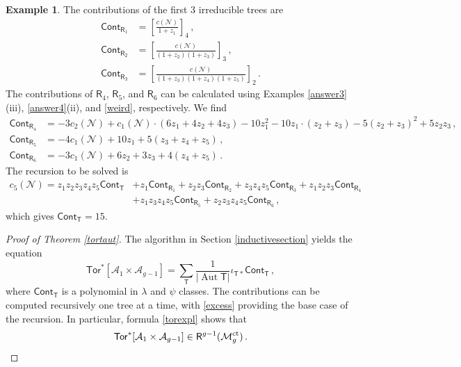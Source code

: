 \documentclass[11pt]{amsart}
\theoremstyle{definition}
\newtheorem{example}[thm]{Example}
\newcommand{\R}{\mathsf{R}}
\newcommand{\M}{\mathcal{M}}
\newcommand{\A}{\mathcal{A}}
\DeclareMathOperator{\ct}{ct}
\DeclareMathOperator{\Aut}{Aut}
\newcommand{\Tor}{\mathsf{Tor}}
\begin{document}
{\begin{example}
The contributions of the first $3$ irreducible trees are 
\begin{align*}\mathsf {Cont}_{\mathsf R_1}&=\left[\frac{c(\mathcal N)}{1+z_1}\right]_{4}\,,\\
\mathsf{Cont}_{\mathsf {R_2}}&=\left[\frac{c(\mathcal N)}{(1+z_2)(1+z_3)}\right]_{3}\, ,\\
\mathsf{Cont}_{\mathsf {R_3}}&=\left[\frac{c(\mathcal N)}{(1+z_3)(1+z_4)(1+z_5)}\right]_{2}\,.
\end{align*} 
The contributions of $\mathsf{R}_4$, $\mathsf{R}_5$, and $\mathsf{R}_6$ can be calculated using Examples \ref{answer3} (iii), \ref{answer4}(ii), and \ref{weird}, respectively. We find 
\begin{align*}
\mathsf{Cont}_{\mathsf R_4}&=-3c_2(\mathcal N)+c_1(\mathcal N)\cdot (6z_1+4z_2+4z_3)-10z_1^2-10 z_1\cdot (z_2+z_3)-5(z_2+z_3)^2+5z_2z_3\,,\\
\mathsf{Cont}_{\mathsf R_5}&=-4c_1(\mathcal N)+10z_1+5(z_3+z_4+z_5)\,,\\
\mathsf{Cont}_{\mathsf {R}_6}&=-3c_1(\mathcal N)+6z_2+3z_3+4(z_4+z_5)\,.
\end{align*}
The recursion to be solved is 
\begin{align*}c_5(\mathcal N)=z_1z_2z_3z_4z_5{\mathsf {Cont}}_{\mathsf T}&+z_1\mathsf{Cont}_{\mathsf {R}_1}
+z_2z_3\mathsf{Cont}_{\mathsf R_2}+z_3z_4z_5\mathsf{Cont}_{\mathsf R_3}+z_1z_2z_3\mathsf{Cont}_{\mathsf R_4}\\&+z_1z_3z_4z_5\mathsf{Cont}_{\mathsf R_5} +z_2z_3z_4z_5\mathsf{Cont}_{\mathsf R_6}\,,\end{align*} which gives $\mathsf{Cont}_{\mathsf T}=15.$
\end{example}

\begin{proof}[Proof of Theorem \ref{tortaut}]
    The algorithm in Section \ref{inductivesection} yields
    the equation \begin{equation}\label{torexpl}\Tor^*[\A_1\times \A_{g-1}]=\sum_{\mathsf T}\frac{1}{|\Aut \mathsf{T}|} \iota_{\mathsf T *} \mathsf{Cont}_{\mathsf{T}}\,,
\end{equation} where $\mathsf{Cont}_{\mathsf{T}}$ is a polynomial in $\lambda$ and $\psi$ classes. The contributions can be computed recursively one tree at a time, with \eqref{excess} providing the base case of the recursion. In particular, formula \eqref{torexpl} shows that \[\Tor^*[\A_1\times \A_{g-1}]\in \R^{g-1}(\M_g^{\ct})\,.\qedhere\]\end{proof}

}
\end{document}
